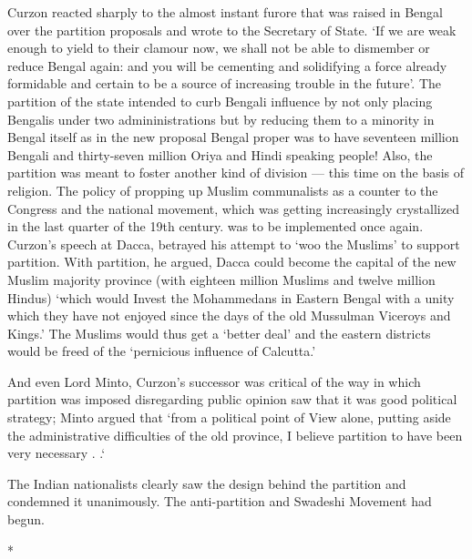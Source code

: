 Curzon reacted sharply to the almost instant furore that was raised in Bengal over the partition proposals and wrote to the Secretary of State. `If we are weak enough to yield to their clamour now, we shall not be able to dismember or reduce Bengal again: and you will be cementing and solidifying a force already formidable and certain to be a source of increasing trouble in the future'. The partition of the state intended to curb Bengali influence by not only placing Bengalis under two admininistrations but by reducing them to a minority in Bengal itself as in the new proposal Bengal proper was to have seventeen million Bengali and thirty-seven million Oriya and Hindi speaking people! Also, the partition was meant to foster another kind of division --- this time on the basis of religion. The policy of propping up Muslim communalists as a counter to the Congress and the national movement, which was getting increasingly crystallized in the last quarter of the 19th century. was to be implemented once again. Curzon's speech at Dacca, betrayed his attempt to `woo the Muslims' to support partition. With partition, he argued, Dacca could become the capital of the new Muslim majority province (with eighteen million Muslims and twelve million Hindus) `which would Invest the Mohammedans in Eastern Bengal with a unity which they have not enjoyed since the days of the old Mussulman Viceroys and Kings.' The Muslims would thus get a `better deal' and the eastern districts would be freed of the `pernicious influence of Calcutta.'

And even Lord Minto, Curzon's successor was critical of the way in which partition was imposed disregarding public opinion saw that it was good political strategy; Minto argued that `from a political point of View alone, putting aside the administrative difficulties of the old province, I believe partition to have been very necessary . .`

The Indian nationalists clearly saw the design behind the partition and condemned it unanimously. The anti-partition and Swadeshi Movement had begun.

\begin{center}*\end{center}

\paragraph*{}

